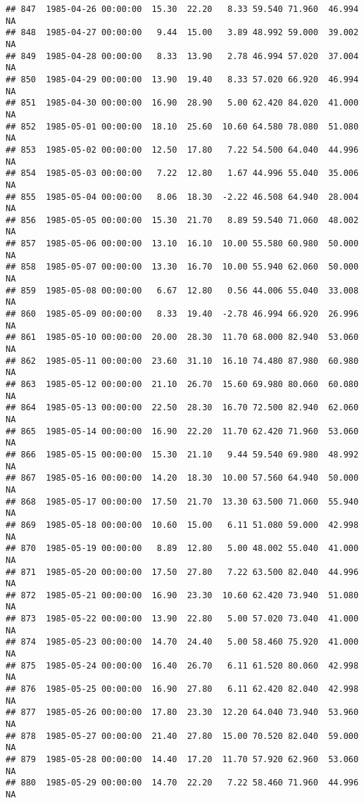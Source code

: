 \documentclass{article}\usepackage{graphicx, color}
\makeatletter
\newenvironment{kframe}{%
 \def\at@end@of@kframe{}%
 \ifinner\ifhmode%
  \def\at@end@of@kframe{\end{minipage}}%
  \begin{minipage}{\columnwidth}%
 \fi\fi%
 \def\FrameCommand##1{\hskip\@totalleftmargin \hskip-\fboxsep
 \colorbox{shadecolor}{##1}\hskip-\fboxsep
     \hskip-\linewidth \hskip-\@totalleftmargin \hskip\columnwidth}%
 \MakeFramed {\advance\hsize-\width
   \@totalleftmargin\z@ \linewidth\hsize
   \@setminipage}}%
 {\par\unskip\endMakeFramed%
 \at@end@of@kframe}
\newenvironment{knitrout}{}{} %
\makeatother
\begin{document}
\begin{knitrout}
\begin{kframe}
\begin{verbatim}
## 847  1985-04-26 00:00:00  15.30  22.20   8.33 59.540 71.960  46.994     NA
## 848  1985-04-27 00:00:00   9.44  15.00   3.89 48.992 59.000  39.002     NA
## 849  1985-04-28 00:00:00   8.33  13.90   2.78 46.994 57.020  37.004     NA
## 850  1985-04-29 00:00:00  13.90  19.40   8.33 57.020 66.920  46.994     NA
## 851  1985-04-30 00:00:00  16.90  28.90   5.00 62.420 84.020  41.000     NA
## 852  1985-05-01 00:00:00  18.10  25.60  10.60 64.580 78.080  51.080     NA
## 853  1985-05-02 00:00:00  12.50  17.80   7.22 54.500 64.040  44.996     NA
## 854  1985-05-03 00:00:00   7.22  12.80   1.67 44.996 55.040  35.006     NA
## 855  1985-05-04 00:00:00   8.06  18.30  -2.22 46.508 64.940  28.004     NA
## 856  1985-05-05 00:00:00  15.30  21.70   8.89 59.540 71.060  48.002     NA
## 857  1985-05-06 00:00:00  13.10  16.10  10.00 55.580 60.980  50.000     NA
## 858  1985-05-07 00:00:00  13.30  16.70  10.00 55.940 62.060  50.000     NA
## 859  1985-05-08 00:00:00   6.67  12.80   0.56 44.006 55.040  33.008     NA
## 860  1985-05-09 00:00:00   8.33  19.40  -2.78 46.994 66.920  26.996     NA
## 861  1985-05-10 00:00:00  20.00  28.30  11.70 68.000 82.940  53.060     NA
## 862  1985-05-11 00:00:00  23.60  31.10  16.10 74.480 87.980  60.980     NA
## 863  1985-05-12 00:00:00  21.10  26.70  15.60 69.980 80.060  60.080     NA
## 864  1985-05-13 00:00:00  22.50  28.30  16.70 72.500 82.940  62.060     NA
## 865  1985-05-14 00:00:00  16.90  22.20  11.70 62.420 71.960  53.060     NA
## 866  1985-05-15 00:00:00  15.30  21.10   9.44 59.540 69.980  48.992     NA
## 867  1985-05-16 00:00:00  14.20  18.30  10.00 57.560 64.940  50.000     NA
## 868  1985-05-17 00:00:00  17.50  21.70  13.30 63.500 71.060  55.940     NA
## 869  1985-05-18 00:00:00  10.60  15.00   6.11 51.080 59.000  42.998     NA
## 870  1985-05-19 00:00:00   8.89  12.80   5.00 48.002 55.040  41.000     NA
## 871  1985-05-20 00:00:00  17.50  27.80   7.22 63.500 82.040  44.996     NA
## 872  1985-05-21 00:00:00  16.90  23.30  10.60 62.420 73.940  51.080     NA
## 873  1985-05-22 00:00:00  13.90  22.80   5.00 57.020 73.040  41.000     NA
## 874  1985-05-23 00:00:00  14.70  24.40   5.00 58.460 75.920  41.000     NA
## 875  1985-05-24 00:00:00  16.40  26.70   6.11 61.520 80.060  42.998     NA
## 876  1985-05-25 00:00:00  16.90  27.80   6.11 62.420 82.040  42.998     NA
## 877  1985-05-26 00:00:00  17.80  23.30  12.20 64.040 73.940  53.960     NA
## 878  1985-05-27 00:00:00  21.40  27.80  15.00 70.520 82.040  59.000     NA
## 879  1985-05-28 00:00:00  14.40  17.20  11.70 57.920 62.960  53.060     NA
## 880  1985-05-29 00:00:00  14.70  22.20   7.22 58.460 71.960  44.996     NA

\end{verbatim}
\end{kframe}
\end{knitrout}
\end{document}
